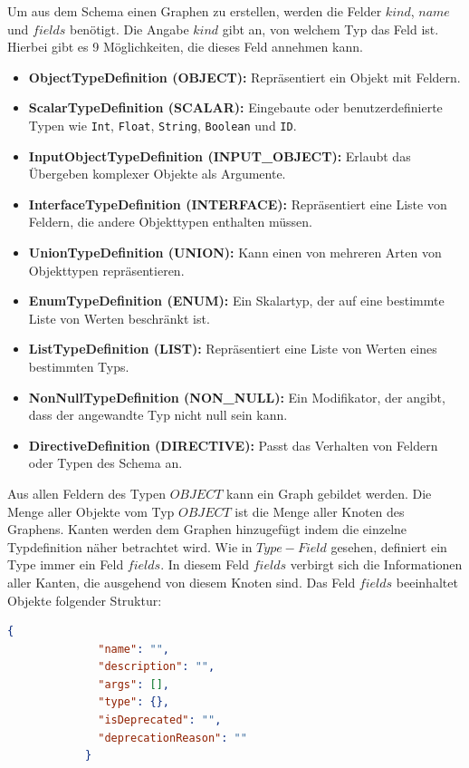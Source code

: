 Um aus dem Schema einen Graphen zu erstellen, werden die Felder $kind$, $name$ und $fields$ benötigt.
Die Angabe $kind$ gibt an, von welchem Typ das Feld ist.
Hierbei gibt es 9 Möglichkeiten, die dieses Feld annehmen kann.

\begin{itemize}
    \item \textbf{ObjectTypeDefinition (OBJECT):} Repräsentiert ein Objekt mit Feldern.
    \item \textbf{ScalarTypeDefinition (SCALAR):} Eingebaute oder benutzerdefinierte Typen wie \texttt{Int}, \texttt{Float}, \texttt{String}, \texttt{Boolean} und \texttt{ID}.
    \item \textbf{InputObjectTypeDefinition (INPUT\_OBJECT):} Erlaubt das Übergeben komplexer Objekte als Argumente.
    \item \textbf{InterfaceTypeDefinition (INTERFACE):} Repräsentiert eine Liste von Feldern, die andere Objekttypen enthalten müssen.
    \item \textbf{UnionTypeDefinition (UNION):} Kann einen von mehreren Arten von Objekttypen repräsentieren.
    \item \textbf{EnumTypeDefinition (ENUM):} Ein Skalartyp, der auf eine bestimmte Liste von Werten beschränkt ist.
    \item \textbf{ListTypeDefinition (LIST):} Repräsentiert eine Liste von Werten eines bestimmten Typs.
    \item \textbf{NonNullTypeDefinition (NON\_NULL):} Ein Modifikator, der angibt, dass der angewandte Typ nicht null sein kann.
    \item \textbf{DirectiveDefinition (DIRECTIVE):} Passt das Verhalten von Feldern oder Typen des Schema an.
\end{itemize}

Aus allen Feldern des Typen $OBJECT$ kann ein Graph gebildet werden.
Die Menge aller Objekte vom Typ $OBJECT$ ist die Menge aller Knoten des Graphens.
Kanten werden dem Graphen hinzugefügt indem die einzelne Typdefinition näher betrachtet wird.
Wie in $Type-Field$ gesehen, definiert ein Type immer ein Feld $fields$.
In diesem Feld $fields$ verbirgt sich die Informationen aller Kanten, die ausgehend von diesem Knoten sind.
Das Feld $fields$ beeinhaltet Objekte folgender Struktur:

\begin{lstlisting}[language=json, caption={Type-Field},captionpos=b]
            {
              "name": "",
              "description": "",
              "args": [],
              "type": {},
              "isDeprecated": "",
              "deprecationReason": ""
            }
\end{lstlisting}

